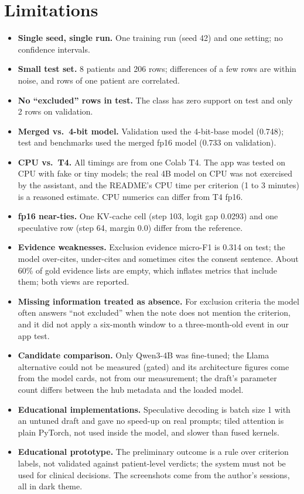 \documentclass[conference]{IEEEtran}
\begin{document}
\section{Limitations}
\begin{itemize}
\item \textbf{Single seed, single run.} One training run (seed 42) and one setting; no confidence intervals.
\item \textbf{Small test set.} 8 patients and 206 rows; differences of a few rows are within noise, and rows of one patient are correlated.
\item \textbf{No ``excluded'' rows in test.} The class has zero support on test and only 2 rows on validation.
\item \textbf{Merged vs.\ 4-bit model.} Validation used the 4-bit-base model (0.748); test and benchmarks used the merged fp16 model (0.733 on validation).
\item \textbf{CPU vs.\ T4.} All timings are from one Colab T4. The app was tested on CPU with fake or tiny models; the real 4B model on CPU was not exercised by the assistant, and the README's CPU time per criterion (1 to 3 minutes) is a reasoned estimate. CPU numerics can differ from T4 fp16.
\item \textbf{fp16 near-ties.} One KV-cache cell (step 103, logit gap 0.0293) and one speculative row (step 64, margin 0.0) differ from the reference.
\item \textbf{Evidence weaknesses.} Exclusion evidence micro-F1 is 0.314 on test; the model over-cites, under-cites and sometimes cites the consent sentence. About 60\% of gold evidence lists are empty, which inflates metrics that include them; both views are reported.
\item \textbf{Missing information treated as absence.} For exclusion criteria the model often answers ``not excluded'' when the note does not mention the criterion, and it did not apply a six-month window to a three-month-old event in our app test.
\item \textbf{Candidate comparison.} Only Qwen3-4B was fine-tuned; the Llama alternative could not be measured (gated) and its architecture figures come from the model cards, not from our measurement; the draft's parameter count differs between the hub metadata and the loaded model.
\item \textbf{Educational implementations.} Speculative decoding is batch size 1 with an untuned draft and gave no speed-up on real prompts; tiled attention is plain PyTorch, not used inside the model, and slower than fused kernels.
\item \textbf{Educational prototype.} The preliminary outcome is a rule over criterion labels, not validated against patient-level verdicts; the system must not be used for clinical decisions. The screenshots come from the author's sessions, all in dark theme.
\end{itemize}
\end{document}

